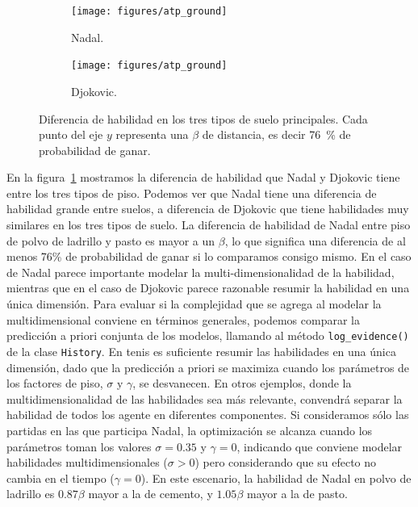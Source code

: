 \documentclass[a4paper,11pt]{book}
\theoremstyle{definition}
\begin{document}
\begin{figure}[ht!]
    \centering
    \begin{subfigure}[t]{0.48\textwidth}
    \texttt{[image: figures/atp\_ground]}
    \caption{Nadal.}
    \end{subfigure}
    \begin{subfigure}[t]{0.48\textwidth}
    \texttt{[image: figures/atp\_ground]}
    \caption{Djokovic.}
    \end{subfigure}
    \caption{
    Diferencia de habilidad en los tres tipos de suelo principales.
    Cada punto del eje $y$ representa una $\beta$ de distancia, es decir \SI{76}{\percent} de probabilidad de ganar.
    }
    \label{fig:atp_ground}
\end{figure}
%
En la figura~\ref{fig:atp_ground} mostramos la diferencia de habilidad que Nadal y Djokovic tiene entre los tres tipos de piso.
%
Podemos ver que Nadal tiene una diferencia de habilidad grande entre suelos, a diferencia de Djokovic que tiene habilidades muy similares en los tres tipos de suelo.
%
La diferencia de habilidad de Nadal entre piso de polvo de ladrillo y pasto es mayor a un $\beta$, lo que significa una diferencia de al menos 76\% de probabilidad de ganar si lo comparamos consigo mismo.
%
En el caso de Nadal parece importante modelar la multi-dimensionalidad de la habilidad, mientras que en el caso de Djokovic parece razonable resumir la habilidad en una única dimensión.
%
Para evaluar si la complejidad que se agrega al modelar la multidimensional conviene en términos generales, podemos comparar la predicción a priori conjunta de los modelos, llamando al método \texttt{log\_evidence()} de la clase \texttt{History}.
En tenis es suficiente resumir las habilidades en una única dimensión, dado que la predicción a priori se maximiza cuando los parámetros de los factores de piso, $\sigma$ y $\gamma$, se desvanecen.
%
En otros ejemplos, donde la multidimensionalidad de las habilidades sea más relevante, convendrá separar la habilidad de todos los agente en diferentes componentes.
%
Si consideramos sólo las partidas en las que participa Nadal, la optimización se alcanza cuando los parámetros toman los valores $\sigma=0.35$ y $\gamma=0$, indicando que conviene modelar habilidades multidimensionales ($\sigma>0$) pero considerando que su efecto no cambia en el tiempo ($\gamma = 0$).
%
En este escenario, la habilidad de Nadal en polvo de ladrillo es $0.87\beta$ mayor a la de cemento, y $1.05\beta$ mayor a la de pasto.
\end{document}
